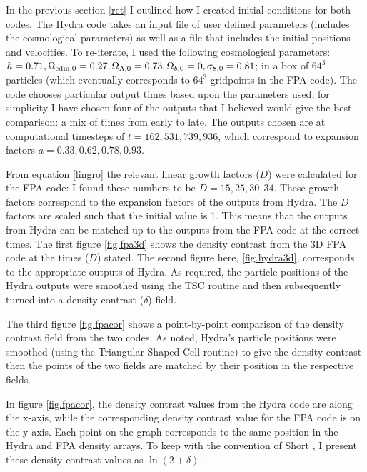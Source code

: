 In the previous section \ref{rct} I outlined how I created initial conditions for both codes. The Hydra code takes an input file of user defined parameters (includes the cosmological parameters) as well as a file that includes the initial positions and velocities. To re-iterate, I used the following cosmological parameters:  $h= 0.71, \Omega_{\rm cdm,0}=0.27, \Omega_{\Lambda,0}=0.73,\Omega_{b,0} =0, \sigma_{8,0}=0.81$; in a box of $64^3$ particles (which eventually corresponds to $64^3$ gridpoints in the FPA code). The code chooses particular output times based upon the parameters used; for simplicity I have chosen four of the outputs that I believed would give the best comparison: a mix of times from early to late. The outputs chosen are at computational timesteps of $t = 162, 531, 739, 936$, which correspond to expansion factors $a = 0.33, 0.62, 0.78, 0.93$.

From equation \ref{lingro} the relevant linear growth factors ($D$) were calculated for the FPA code: I found these numbers to be $D= 15, 25, 30, 34$. These growth factors correspond to the expansion factors of the outputs from Hydra. The $D$ factors are scaled such that the initial value is 1. This means that the outputs from Hydra can be matched up to the outputs from the FPA code at the correct times. The first figure \ref{fig.fpa3d} shows the density contrast from the 3D FPA code at the times ($D$) stated. The second figure here, \ref{fig.hydra3d}, corresponds to the appropriate outputs of Hydra. As required, the particle positions of the Hydra outputs were smoothed using the TSC routine and then subsequently turned into a density contrast ($\delta$) field.

The third figure \ref{fig.fpacor} shows a point-by-point comparison of the density contrast field from the two codes. As noted, Hydra's particle positions were smoothed (using the Triangular Shaped Cell routine) to give the density contrast then the points of the two fields are matched by their position in the respective fields. 

In figure \ref{fig.fpacor}, the density contrast values from the Hydra code are along the x-axis, while the corresponding density contrast value for the FPA code is on the y-axis. Each point on the graph corresponds to the same position in the Hydra and FPA density arrays. To keep with the convention of Short \citep{bib_short}, I present these density contrast values as $\ln (2 + \delta)$.

